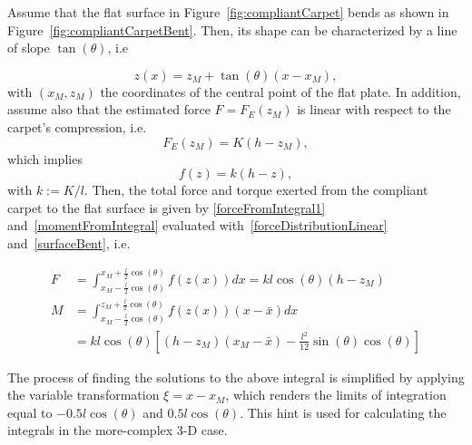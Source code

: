\documentclass{article}
\begin{document}
Assume that the flat surface in Figure~\ref{fig:compliantCarpet} bends as shown in 
Figure~\ref{fig:compliantCarpetBent}. Then, its shape can be characterized by a line of slope $\tan(\theta)$, i.e

\begin{equation}
\label{surfaceBent}
z(x) = z_M + \tan(\theta) (x-x_M),
\end{equation}
with $(x_M,z_M)$ the coordinates of the central point of the flat plate.
In addition,
assume  also that the estimated force $F = F_E(z_M)$ is linear with respect to the carpet's compression, i.e.
\begin{equation*}
    F_E(z_M) = K(h-z_M),
\end{equation*}
which implies 
\begin{equation}
    \label{forceDistributionLinear}
    f(z) = k(h-z),
\end{equation}
with $k:= K/l$. Then, the total force and torque exerted from the compliant carpet to the flat surface is given by  \eqref{forceFromIntegral1} and~\eqref{momentFromIntegral} evaluated with~\eqref{forceDistributionLinear} and~\eqref{surfaceBent}, i.e.

\begin{subequations}
    \begin{alignat}{2}
        F &= \int_{x_M-\frac{l}{2}\cos(\theta)}^{x_M+\frac{l}{2}\cos(\theta)} f(z(x))dx=kl\cos(\theta)\left(h-z_M \right) \\\nonumber
        M &=\int_{x_M-\frac{l}{2}\cos(\theta)}^{z_M+\frac{l}{2}\cos(\theta)} f(z(x))(x{-}\bar{x}) dx \\ 
          &= kl\cos(\theta) \left[ (h-z_M)\left(x_M-\bar{x} \right) - 
          \frac{l^2}{12} \sin(\theta)\cos(\theta) \right] 
    \end{alignat}
\end{subequations}
%
\begin{figure}[t]
\end{figure}

The process of finding the solutions to the above integral is simplified by applying the variable transformation $\xi = x - x_M$, which renders the limits of integration equal to $-0.5l \cos(\theta)$ and $0.5l \cos(\theta)$. This hint is used for calculating the integrals in the more-complex 3-D case.
\end{document}
